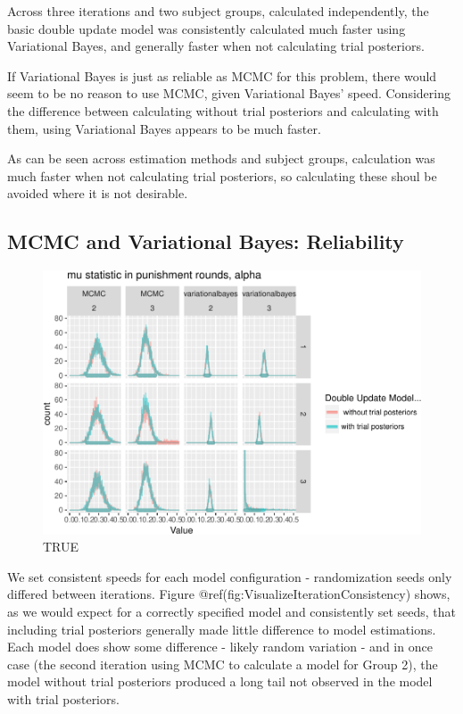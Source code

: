 \documentclass[]{article}
\begin{document}
Across three iterations and two subject groups, calculated
independently, the basic double update model was consistently calculated
much faster using Variational Bayes, and generally faster when not
calculating trial posteriors.

If Variational Bayes is just as reliable as MCMC for this problem, there
would seem to be no reason to use MCMC, given Variational Bayes' speed.
Considering the difference between calculating without trial posteriors
and calculating with them, using Variational Bayes appears to be much
faster.

As can be seen across estimation methods and subject groups, calculation
was much faster when not calculating trial posteriors, so calculating
these shoul be avoided where it is not desirable.

\subsection{MCMC and Variational Bayes:
Reliability}\label{mcmc-and-variational-bayes-reliability}

\begin{figure}[htbp]
\centering
\includegraphics{compare_vb_and_MCMC_doubleUpdateOnly_files/figure-latex/VisualizeIterationConsistency-1.pdf}
\caption{TRUE}
\end{figure}

We set consistent speeds for each model configuration - randomization
seeds only differed between iterations. Figure
@ref(fig:VisualizeIterationConsistency) shows, as we would expect for a
correctly specified model and consistently set seeds, that including
trial posteriors generally made little difference to model estimations.
Each model does show some difference - likely random variation - and in
once case (the second iteration using MCMC to calculate a model for
Group 2), the model without trial posteriors produced a long tail not
observed in the model with trial posteriors.
\end{document}
